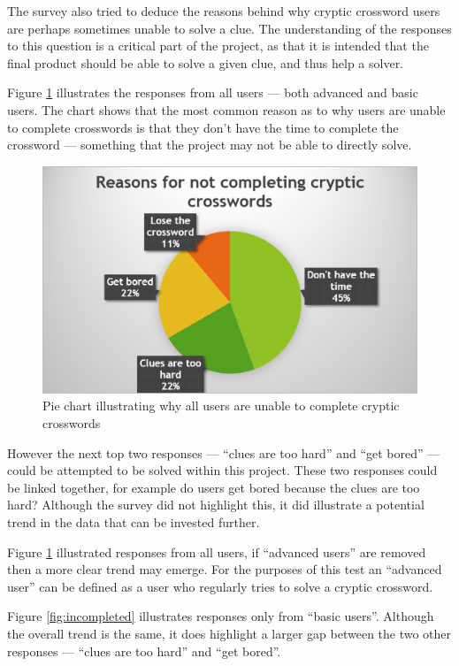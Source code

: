 The survey also tried to deduce the reasons behind why cryptic crossword users 
are perhaps sometimes unable to solve a clue. The understanding of the responses
to this question is a critical part of the project, as that it is intended that
the final product should be able to solve a given clue, and thus help a solver.

Figure \ref{fig:incomplete} illustrates the responses from all users --- both 
advanced and basic users. The chart shows that the most common reason as to why
users are unable to complete crosswords is that they don't have the time to 
complete the crossword --- something that the project may not be able to 
directly solve.

\begin{figure}[H]
  \centering
  \includegraphics[scale=0.9]{graphs/incomplete.png}
  \caption{Pie chart illustrating why all users are unable to complete cryptic 
          crosswords}
  \label{fig:incomplete}
\end{figure}

However the next top two responses --- ``clues are too hard'' and ``get bored'' 
--- could be attempted to be solved within this project. These two responses 
could be linked together, for example do users get bored because the clues are 
too hard? Although the survey did not highlight this, it did illustrate a 
potential trend in the data that can be invested further.

Figure \ref{fig:incomplete} illustrated responses from all users, if 
``advanced users'' are removed then a more clear trend may emerge. For the 
purposes of this test an ``advanced user'' can be defined as a user who 
regularly tries to solve a cryptic crossword.

Figure \ref{fig:incompleted} illustrates responses only from ``basic users''. 
Although the overall trend is the same, it does highlight a larger gap between 
the two other responses --- ``clues are too hard'' and ``get bored''. 


